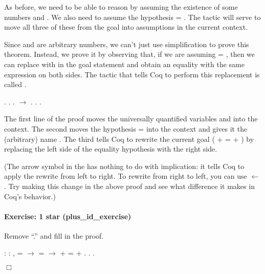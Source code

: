 \documentclass[12pt]{report}
\begin{document}
    As before, we need to be able to reason by assuming the existence
    of some numbers  and .  We also need to assume the hypothesis
     = . The  tactic will serve to move all three of these
    from the goal into assumptions in the current context. 


    Since  and  are arbitrary numbers, we can't just use
    simplification to prove this theorem.  Instead, we prove it by
    observing that, if we are assuming  = , then we can replace
     with  in the goal statement and obtain an equality with the
    same expression on both sides.  The tactic that tells Coq to
    perform this replacement is called . \begin{coqdoccode}
\coqdocemptyline
\coqdocnoindent
{}.\coqdoceol
\coqdocindent{1.00em}
  . \coqdocindent{1.00em}
 . \coqdocindent{1.00em}
 \ensuremath{\rightarrow} . \coqdocindent{1.00em}
. .\coqdoceol
\coqdocemptyline
\end{coqdoccode}
The first line of the proof moves the universally quantified
    variables  and  into the context.  The second moves the
    hypothesis  =  into the context and gives it the (arbitrary)
    name .  The third tells Coq to rewrite the current goal ( + 
    =  + ) by replacing the left side of the equality hypothesis
     with the right side.


    (The arrow symbol in the  has nothing to do with
    implication: it tells Coq to apply the rewrite from left to right.
    To rewrite from right to left, you can use  \ensuremath{\leftarrow}.  Try
    making this change in the above proof and see what difference it
    makes in Coq's behavior.) 

\paragraph{Exercise: 1 star (plus\_id\_exercise)}

 Remove ``.'' and fill in the proof. \begin{coqdoccode}
\coqdocemptyline
\coqdocnoindent
{}  : \coqdockw{\ensuremath{\forall}}    : ,\coqdoceol
\coqdocindent{1.00em}
 =  \ensuremath{\rightarrow}  =  \ensuremath{\rightarrow}  +  =  + .\coqdoceol
\coqdocnoindent
{}.\coqdoceol
 .\coqdoceol
\end{coqdoccode}
\ensuremath{\Box} 
\end{document}
